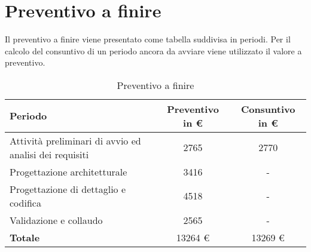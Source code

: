 \section{Preventivo a finire}
Il preventivo a finire viene presentato come tabella suddivisa in periodi. Per il calcolo del consuntivo di un periodo ancora da avviare viene utilizzato il valore a preventivo.
\begin{table}[h!] %
            \centering
            \renewcommand{\arraystretch}{2} %
            \begin{tabular}{|l|c|c|} %
                \rowcolor{orange!50} %
        		\hline
        		\textbf{Periodo} & \textbf{Preventivo in \euro} & \textbf{Consuntivo in \euro}\\
                \hline
                Attività preliminari di avvio ed analisi dei requisiti & 2765 & 2770\\
                \hline
                Progettazione architetturale & 3416 & -\\
                \hline
                Progettazione di dettaglio e codifica & 4518 & -\\
                \hline
                Validazione e collaudo & 2565 & -\\
                \hline
                \textbf{Totale} & 13264 \euro & 13269 \euro\\
                \hline
        \end{tabular}
        \caption{Preventivo a finire} %
        \label{tab:my_label}
\end{table}
